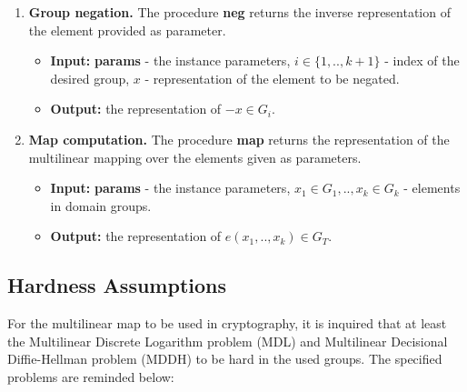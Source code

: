 \begin{enumerate}[label=(\alph*)]
	\item \textbf{Group negation.} The procedure \textbf{neg} returns the inverse representation of the  element provided as parameter.
\begin{itemize}
	\item \textbf{Input:} \textbf{params} - the instance parameters, $i \in \{1,..,k+1\}$ - index of the desired group, $x$ - representation of the element to be negated.
	\item \textbf{Output:} the representation of $-x \in G_i$.                                     
\end{itemize}


	\item \textbf{Map computation.} The procedure \textbf{map} returns the representation of the multilinear mapping over the elements given as parameters.
\begin{itemize}
	\item \textbf{Input:} \textbf{params} - the instance parameters, $x_1\in G_1, .., x_k \in G_k$ - elements in domain groups.
	\item \textbf{Output:} the representation of $e(x_1,..,x_k) \in G_T$.
\end{itemize}
\end{enumerate}

\subsection{Hardness Assumptions}
For the multilinear map to be used in cryptography, it is inquired that at least the Multilinear Discrete Logarithm problem (MDL) and Multilinear Decisional Diffie-Hellman problem (MDDH) to be hard in the used groups. The specified problems are reminded below:

